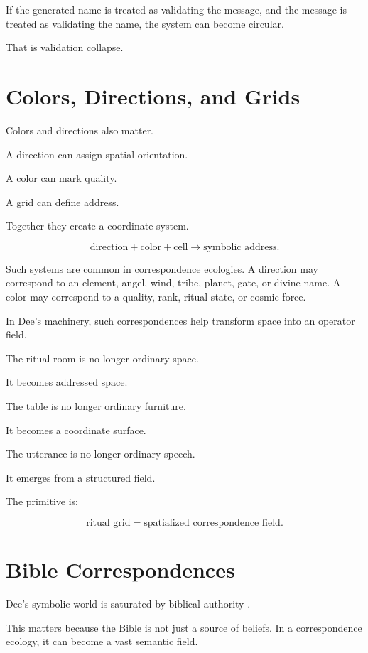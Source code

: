 \documentclass[11pt]{book}
\begin{document}
If the generated name is treated as validating the message, and the message is treated as validating the name, the system can become circular.

That is validation collapse.

\section{Colors, Directions, and Grids}

Colors and directions also matter.

A direction can assign spatial orientation.

A color can mark quality.

A grid can define address.

Together they create a coordinate system.

\[
\text{direction}
+
\text{color}
+
\text{cell}
\rightarrow
\text{symbolic address}.
\]

Such systems are common in correspondence ecologies. A direction may correspond to an element, angel, wind, tribe, planet, gate, or divine name. A color may correspond to a quality, rank, ritual state, or cosmic force.

In Dee's machinery, such correspondences help transform space into an operator field.

The ritual room is no longer ordinary space.

It becomes addressed space.

The table is no longer ordinary furniture.

It becomes a coordinate surface.

The utterance is no longer ordinary speech.

It emerges from a structured field.

The primitive is:

\[
\text{ritual grid} = \text{spatialized correspondence field}.
\]

\section{Bible Correspondences}

Dee’s symbolic world is saturated by biblical authority \cite{DeeCasaubon1659TrueFaithfulRelation,Yates1964GiordanoBruno}.

This matters because the Bible is not just a source of beliefs. In a correspondence ecology, it can become a vast semantic field.
\end{document}
